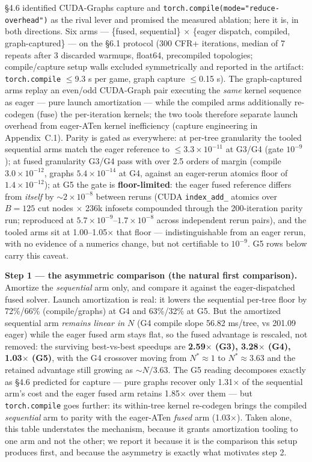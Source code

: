 \documentclass[11pt]{article}
\begin{document}
\S4.6 identified CUDA-Graphs capture and \texttt{torch.compile(mode="reduce-overhead")}
as the rival lever and promised the measured ablation; here it is, in both directions.
Six arms --- \{fused, sequential\} $\times$ \{eager dispatch, compiled, graph-captured\}
--- on the \S6.1 protocol (300 CFR+ iterations, median of 7 repeats after 3 discarded
warmups, float64, precompiled topologies; compile/capture setup walls excluded
symmetrically and reported in the artifact: \texttt{torch.compile} $\le$9.3 s per game,
graph capture $\le$0.15 s). The graph-captured arms replay an even/odd CUDA-Graph pair
executing the \emph{same} kernel sequence as eager --- pure launch amortization ---
while the compiled arms additionally re-codegen (fuse) the per-iteration kernels; the
two tools therefore separate launch overhead from eager-ATen kernel inefficiency
(capture engineering in Appendix~C.1). Parity is gated as everywhere: at per-tree
granularity the tooled sequential arms match the eager reference to
$\le 3.3\times10^{-11}$ at G3/G4 (gate $10^{-9}$); at fused granularity G3/G4 pass with
over 2.5 orders of margin (compile $3.0\times10^{-12}$, graphs $5.4\times10^{-14}$ at
G4, against an eager-rerun atomics floor of $1.4\times10^{-12}$); at G5 the gate is
\textbf{floor-limited}: the eager fused reference differs from \emph{itself} by
$\sim$$2\times10^{-8}$ between reruns (CUDA \texttt{index\_add\_} atomics over $B{=}125$
cut nodes $\times$ 236k infosets compounded through the 200-iteration parity run;
reproduced at $5.7\times10^{-9}$--$1.7\times10^{-8}$ across independent rerun pairs),
and the tooled arms sit at 1.00--1.05$\times$ that floor --- indistinguishable from an
eager rerun, with no evidence of a numerics change, but not certifiable to $10^{-9}$. G5
rows below carry this caveat.

\textbf{Step 1 --- the asymmetric comparison (the natural first comparison).}
Amortize the \emph{sequential} arm only, and compare it against the eager-dispatched
fused solver. Launch amortization is real: it lowers the sequential per-tree floor by
72\%/66\% (compile/graphs) at G4 and 63\%/32\% at G5. But the amortized sequential arm
\emph{remains linear in $N$} (G4 compile slope 56.82 ms/tree, vs 201.09 eager) while the
eager fused arm stays flat, so the fused advantage is rescaled, not removed: the
surviving best-vs-best speedups are \textbf{2.59$\times$ (G3), 3.28$\times$ (G4),
1.03$\times$ (G5)}, with the G4 crossover moving from $N^*\!\approx\!1$ to
$N^*\!\approx\!3.63$ and the retained advantage still growing as $\sim N/3.63$. The G5
reading decomposes exactly as \S4.6 predicted for capture --- pure graphs recover only
1.31$\times$ of the sequential arm's cost and the eager fused arm retains 1.85$\times$
over them --- but \texttt{torch.compile} goes further: its within-tree kernel re-codegen
brings the compiled \emph{sequential} arm to parity with the eager-ATen \emph{fused} arm
(1.03$\times$). Taken alone, this table understates the mechanism, because it grants
amortization tooling to one arm and not the other; we report it because it is the
comparison this setup produces first, and because the asymmetry is exactly what
motivates step 2.
\end{document}

